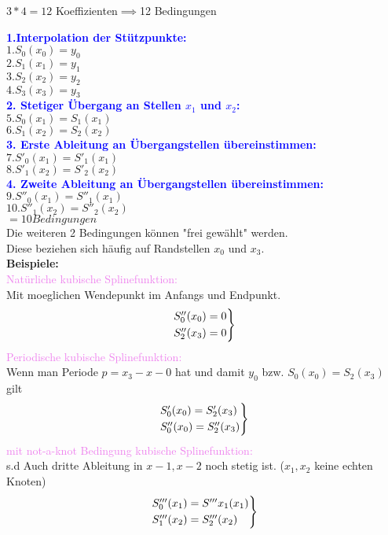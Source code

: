 \documentclass[../ZF_HM2.tex]{subfiles}
\begin{document}
$3*4 = 12$ Koeffizienten$\implies $12 Bedingungen

\textbf{\textcolor{blue}{1.Interpolation der Stützpunkte:}\\}
$1. S_0(x_0) = y_0$\\
$2. S_1(x_1) = y_1$\\
$3. S_2(x_2) = y_2$\\
$4. S_3(x_3) = y_3$\\

\textbf{\textcolor{blue}{2. Stetiger Übergang an Stellen $x_1$ und $x_2$:}\\}
$5. S_0(x_1) =S_1(x_1)$\\
$6. S_1(x_2) =S_2(x_2)$\\

\textbf{\textcolor{blue}{3. Erste Ableitung an Übergangstellen übereinstimmen:}\\}
$7. S'_0(x_1) =S'_1(x_1)$\\
$8. S'_1(x_2) =S'_2(x_2)$\\

\textbf{\textcolor{blue}{4. Zweite Ableitung an Übergangstellen übereinstimmen:}\\}
$9. S''_0(x_1) =S''_1(x_1)$\\
$10. S''_1(x_2) =S''_2(x_2)$\\

$= 10 Bedingungen$\\

Die weiteren 2 Bedingungen können "frei gewählt" werden.\\
Diese beziehen sich häufig auf Randstellen $x_0$ und $x_3$.\\
\textbf{Beispiele:\\}
\textcolor{violet}{Natürliche kubische Splinefunktion:}\\
Mit moeglichen Wendepunkt im Anfangs und Endpunkt.\\
\[
\begin{rcases*}
S''_0(x_0) = 0\\
S''_2(x_3) = 0\\
\end{rcases*} 
\]
\textcolor{violet}{Periodische kubische Splinefunktion:\\}
Wenn man Periode $p=x_3-x-0$ hat und damit $y_0$ bzw. $S_0(x_0) = S_2(x_3)$ gilt
\[
\begin{rcases*}
S'_0(x_0) = S'_2(x_3) \\
S''_0(x_0) = S''_2(x_3) \\
\end{rcases*} 
\]
\textcolor{violet}{mit not-a-knot Bedingung kubische Splinefunktion:\\}
s.d Auch dritte Ableitung in $x-1,x-2$ noch stetig ist. ($x_1,x_2$ keine echten Knoten)
\[
\begin{rcases*}
S'''_0(x_1) = S'''x_1(x_1) \\
S'''_1(x_2) = S'''_2(x_2) \\
\end{rcases*} 
\]
\end{document}
